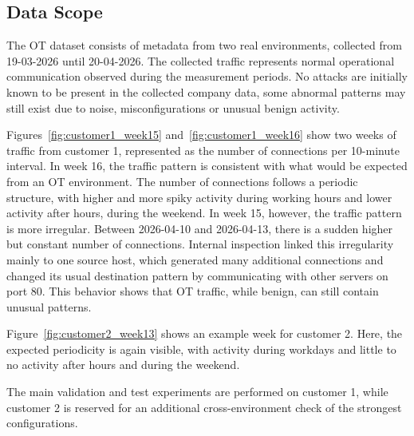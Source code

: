 \subsection{Data Scope}
The OT dataset consists of metadata from two real environments, collected from 19-03-2026 until 20-04-2026. The collected traffic represents normal operational communication observed during the measurement periods. No attacks are initially known to be present in the collected company data, some abnormal patterns may still exist due to noise, misconfigurations or unusual benign activity.


Figures~\ref{fig:customer1_week15} and~\ref{fig:customer1_week16} show two weeks of traffic from customer 1, represented as the number of connections per 10-minute interval. In week 16, the traffic pattern is consistent with what would be expected from an OT environment. The number of connections follows a periodic structure, with higher and more spiky activity during working hours and lower activity after hours, during the weekend. In week 15, however, the traffic pattern is more irregular. Between 2026-04-10 and 2026-04-13, there is a sudden higher but constant number of connections. Internal inspection linked this irregularity mainly to one source host, which generated many additional connections and changed its usual destination pattern by communicating with other servers on port 80. This behavior shows that OT traffic, while benign, can still contain unusual patterns.

Figure~\ref{fig:customer2_week13} shows an example week for customer 2. Here, the expected periodicity is again visible, with activity during workdays and little to no activity after hours and during the weekend. 

The main validation and test experiments are performed on customer 1, while customer 2 is reserved for an additional cross-environment check of the strongest configurations.


